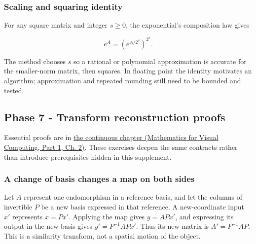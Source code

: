 \subsubsection{Scaling and squaring identity}\label{02-foundations-ii-ch039-scaling-and-squaring-identity}

\hypertarget{02-foundations-ii-ch039-scaling-and-squaring-identity}{}

For any square matrix and integer \(s\ge0\), the exponential's composition law gives

\[
e^A=\left(e^{A/2^s}\right)^{2^s}.
\]

The method chooses \(s\) so a rational or polynomial approximation is accurate for the smaller-norm matrix, then squares. In floating point the identity motivates an algorithm; approximation and repeated rounding still need to be bounded and tested.

\subsection{Phase 7 - Transform reconstruction proofs}\label{02-foundations-ii-ch039-phase-7---transform-reconstruction-proofs}

\hypertarget{02-foundations-ii-ch039-phase-7---transform-reconstruction-proofs}{}

Essential proofs are in \href{../02-Mathematics-for-Visual-Computing-P01/main.pdf\#01-foundations-i-ch018-keep-the-promises-visible-while-moving-between-representations}{the continuous chapter (Mathematics for Visual Computing, Part 1, Ch. 2)}. These exercises deepen the same contracts rather than introduce prerequisites hidden in this supplement.

\subsubsection{A change of basis changes a map on both sides}\label{02-foundations-ii-ch039-a-change-of-basis-changes-a-map-on-both-sides}

\hypertarget{02-foundations-ii-ch039-a-change-of-basis-changes-a-map-on-both-sides}{}

Let \(A\) represent one endomorphism in a reference basis, and let the columns of invertible \(P\) be a new basis expressed in that reference. A new-coordinate input \(x'\) represents \(x=Px'\). Applying the map gives \(y=APx'\), and expressing its output in the new basis gives \(y'=P^{-1}APx'\). Thus its new matrix is \(A'=P^{-1}AP\). This is a similarity transform, not a spatial motion of the object.

